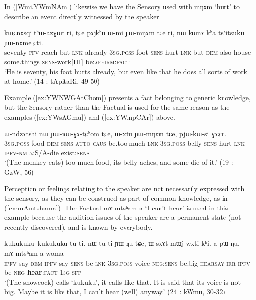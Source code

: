 \documentclass[oldfontcommands,oneside,a4paper,11pt]{article}
\newcommand{\ipa}[1]{{\phon \mbox{#1}}} %
\newcommand{\refb}[1]{(\ref{#1})}
\newcommand{\factual}[1]{\textsc{:fact}}
\begin{document}
In \refb{Wmi.YWmNAm} likewise we have the Sensory used with \ipa{mŋɤm} `hurt' to describe an event directly witnessed by the speaker.

\begin{exe}
\ex \label{Wmi.YWmNAm}
\gll
\ipa{kɯɕnɤsqi} 	\ipa{tʰɯ-azɣɯt} 	\ipa{ri,} \ipa{tɕe} 	\ipa{pɤjkʰu} 	\ipa{ɯ-mi} 	\ipa{ɲɯ-mŋɤm} 	\ipa{tɕe} 	\ipa{ri,} 	\ipa{nɯ} 	\ipa{kɯnɤ} 	\ipa{kʰa} 	\ipa{tsʰitsuku} 	\ipa{ɲɯ-nɤme} 	\ipa{ɕti.} \\
seventy \textsc{pfv}-reach but \textsc{lnk} already \textsc{3sg.poss}-foot \textsc{sens}-hurt \textsc{lnk} but \textsc{dem} also house some.things \textsc{sens}-work[III] be:\textsc{affirm}\factual{} \\
\glt `He is seventy, his foot hurts already, but even like that he does all sorts of work at home.' (14 : tApitaRi, 49-50)
\end{exe}

Example \refb{ex:YWNWGAtChom} presents a fact belonging to generic knowledge, but the Sensory rather than the Factual is used for the same reason as the examples \refb{ex:YWsAGmu} and \refb{ex:YWmpCAr} above.

\begin{exe}
\ex \label{ex:YWNWGAtChom}
\gll
\ipa{ɯ-ndzɤtshi}  	\ipa{nɯ}  	\ipa{ɲɯ-nɯ-ɣɤ-tɕʰom}  	\ipa{tɕe,}  	\ipa{ɯ-xtu}  	\ipa{ɲɯ-mŋɤm}  	\ipa{tɕe,}  	\ipa{pjɯ-kɯ-si}  	\ipa{ɣɤʑu.}  \\
\textsc{3sg.poss}-food \textsc{dem} \textsc{sens-auto-caus}-be.too.much \textsc{lnk} \textsc{3sg.poss}-belly \textsc{sens}-hurt \textsc{lnk} \textsc{ipfv-nmlz}:S/A-die exist:\textsc{sens} \\
\glt `(The monkey eats) too much food, its belly aches, and some die of it.' (19 : GzW, 56)
\end{exe}
  
Perception or feelings relating to the speaker are not necessarily expressed with the sensory, as they can be construed as part of common knowledge, as in \refb{ex:mAmtshama}. The Factual  \ipa{mɤ-mtsʰam-a} `I can't hear' is used in this example because the audition issues of the speaker are a permanent state (not recently discovered), and is known by everybody.

\begin{exe}
\ex \label{ex:mAmtshama}
\gll
\ipa{kukukuku kukukuku} 	\ipa{tu-ti.} 	\ipa{nɯ} 	\ipa{tu-ti} 	\ipa{ɲɯ-ŋu} 	\ipa{tɕe,} 	\ipa{ɯ-skɤt} 	\ipa{mɯ́j-wxti} 	\ipa{kʰi.} 	\ipa{a-pɯ-ŋu,} \ipa{mɤ-mtsʰam-a} 	\ipa{woma} \\
{ } \textsc{ipfv}-say \textsc{dem}  \textsc{ipfv}-say \textsc{sens}-be \textsc{lnk}  \textsc{3sg.poss}-voice \textsc{neg:sens}-be.big \textsc{hearsay} \textsc{irr-ipfv}-be \textsc{neg}-\textbf{hear}:\textsc{fact-1sg} \textsc{sfp} \\
\glt `(The snowcock) calls `kukuku', it calls like that. It is said that its voice is not big. Maybe it is like that, I can't hear (well) anyway.' (24 : kWmu, 30-32)
\end{exe}
\end{document}
